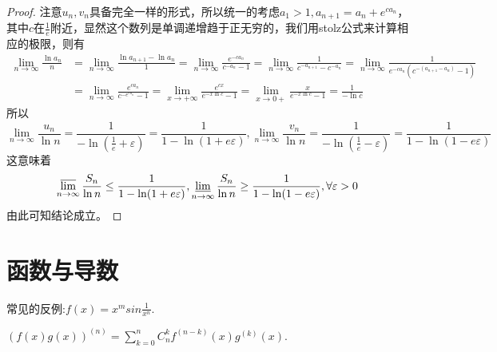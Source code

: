 \documentclass[lang=cn,newtx,10pt,scheme=chinese]{elegantbook}
\begin{document}
\begin{proof}
注意\(u_n,v_n\)具备完全一样的形式，所以统一的考虑\(a_1>1,a_{n + 1}=a_n + e^{ca_n}\)，其中\(c\)在\(\frac{1}{e}\)附近，显然这个数列是单调递增趋于正无穷的，我们用stolz公式来计算相应的极限，则有
\begin{align*}
\lim_{n\rightarrow\infty}\frac{\ln a_n}{n}&=\lim_{n\rightarrow\infty}\frac{\ln a_{n + 1}-\ln a_n}{1}=\lim_{n\rightarrow\infty}\frac{e^{-ca_n}}{c^{-a_n}-1}=\lim_{n\rightarrow\infty}\frac{1}{c^{-a_{n + 1}}-c^{-a_n}}=\lim_{n\rightarrow\infty}\frac{1}{e^{-ca_n}(c^{-(a_{n + 1}-a_n)}-1)}\\
&=\lim_{n\rightarrow\infty}\frac{e^{ca_n}}{c^{-e^{ca_n}}-1}=\lim_{x\rightarrow+\infty}\frac{e^{cx}}{e^{-x\ln c}-1}=\lim_{x\rightarrow0+}\frac{x}{e^{-x\ln c}-1}=\frac{1}{-\ln c}
\end{align*}
所以
\[\lim_{n\rightarrow\infty}\frac{u_n}{\ln n}=\frac{1}{-\ln(\frac{1}{e}+\varepsilon)}=\frac{1}{1-\ln(1 + e\varepsilon)},\lim_{n\rightarrow\infty}\frac{v_n}{\ln n}=\frac{1}{-\ln(\frac{1}{e}-\varepsilon)}=\frac{1}{1-\ln(1 - e\varepsilon)}\]
这意味着
\[\varlimsup_{n\rightarrow\infty}\frac{S_n}{\ln n}\leq\frac{1}{1-\ln(1 + e\varepsilon)},\varliminf_{n\rightarrow\infty}\frac{S_n}{\ln n}\geq\frac{1}{1-\ln(1 - e\varepsilon)},\forall\varepsilon>0\]
由此可知结论成立。
\end{proof}







\chapter{函数与导数}

常见的反例:$f(x)=x^msin\frac{1}{x^n}.$

\begin{theorem}[Leibniz公式]\label{theorem:Leibniz公式}
$(f(x)g(x))^{(n)} = \sum_{k = 0}^{n} C_{n}^{k}f^{(n - k)}(x)g^{(k)}(x).$
\end{theorem}
\end{document}
